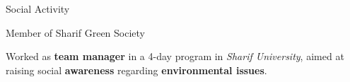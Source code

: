 
        \begin{xSection}{Social Activity}
            \medskip
\small
            \begin{myitemize}
                \item Member of Sharif Green Society
                \item Worked as \textbf{team manager} in a 4-day program in \textit{Sharif University}, aimed at raising social \textbf{awareness} regarding \textbf{environmental issues}.
            \end{myitemize}

        \end{xSection}	

